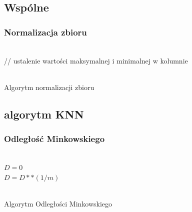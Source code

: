 \documentclass[12pt,a4paper]{article}
\begin{document}
        \subsection{Wspólne}
            \subsubsection*{Normalizacja zbioru}
                \begin{algorithm}[H]
                    ~\\
                    // ustalenie wartości maksymalnej i minimalnej w kolumnie\\
                    ~\\
                    \label{alg:normalize}
                    \caption{Algorytm normalizacji zbioru}
                \end{algorithm}
        
        \subsection{algorytm KNN}
            \subsubsection*{Odległość Minkowskiego}
                \begin{algorithm}[H]
                    ~\\
                    $D = 0$\\
                    $D = D**(1/m)$\\
                    ~\\
                    \label{alg:minkowski}
                    \caption{Algorytm Odległości Minkowskiego}
                \end{algorithm}
            
\end{document}
